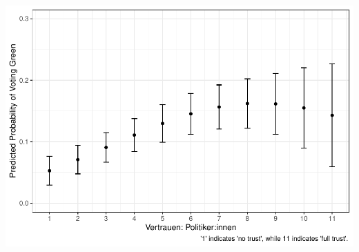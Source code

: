 \documentclass[
]{article}
\begin{document}
\includegraphics{AVCD_Final_Assignment-Edenhofer_files/figure-latex/gruene-trust-politicians-1.pdf}
\end{document}
